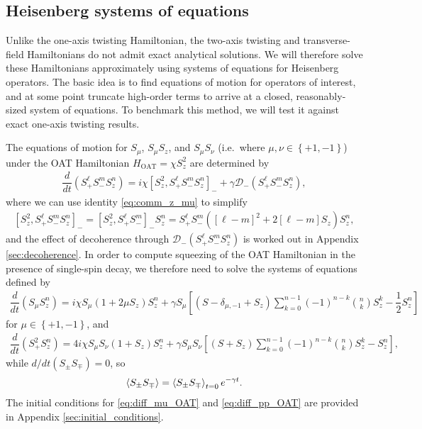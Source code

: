 \documentclass[aps,notitlepage,nofootinbib,11pt]{revtex4-1}
\renewcommand{\t}{\text} %
\newcommand{\f}[2]{\dfrac{#1}{#2}} %
\newcommand{\p}[1]{\left(#1\right)} %
\renewcommand{\sp}[1]{\left[#1\right]} %
\renewcommand{\set}[1]{\left\{#1\right\}} %
\newcommand{\bk}{\Braket} %
\newcommand{\D}{\mathcal{D}}
\newcommand{\1}{\mathds{1}}
\begin{document}
\subsection{Heisenberg systems of equations}

Unlike the one-axis twisting Hamiltonian, the two-axis twisting and
transverse-field Hamiltonians do not admit exact analytical
solutions. We will therefore solve these Hamiltonians approximately
using systems of equations for Heisenberg operators.  The basic idea
is to find equations of motion for operators of interest, and at some
point truncate high-order terms to arrive at a closed,
reasonably-sized system of equations.  To benchmark this method, we
will test it against exact one-axis twisting results.

The equations of motion for $S_\mu$, $S_\mu S_z$, and $S_\mu S_\nu$
(i.e.~where $\mu,\nu\in\set{+1,-1}$) under the OAT Hamiltonian
$H_{\t{OAT}}=\chi S_z^2$ are determined by
\begin{align}
  \f{d}{dt} \p{S_+^\ell S_-^m S_z^n}
  = i\chi \sp{S_z^2, S_+^\ell S_-^m S_z^n}_-
  + \gamma \D_-\p{S_+^\ell S_-^m S_z^n},
\end{align}
where we can use identity \eqref{eq:comm_z_mu} to simplify
\begin{align}
  \sp{S_z^2, S_+^\ell S_-^m S_z^n}_-
  = \sp{S_z^2, S_+^\ell S_-^m}_- S_z^n
  = S_+^\ell S_-^m \p{\sp{\ell-m}^2 + 2\sp{\ell-m} S_z} S_z^n,
  \label{eq:S_z^2_comm}
\end{align}
and the effect of decoherence through $\D_-\p{S_+^\ell S_-^m S_z^n}$ is
worked out in Appendix \ref{sec:decoherence}.  In order to compute
squeezing of the OAT Hamiltonian in the presence of single-spin decay,
we therefore need to solve the systems of equations defined by
\begin{align}
  \f{d}{dt} \p{S_\mu S_z^n}
  = i\chi S_\mu \p{1 + 2\mu S_z} S_z^n
  + \gamma S_\mu \sp{\p{S - \delta_{\mu,-1} + S_z} \sum_{k=0}^{n-1}
    \p{-1}^{n-k} { n \choose k } S_z^k - \f12 S_z^n}
  \label{eq:diff_mu_OAT}
\end{align}
for $\mu\in\set{+1,-1}$, and
\begin{align}
  \f{d}{dt} \p{S_+^2 S_z^n}
  = 4i\chi S_\mu S_\nu \p{1 + S_z} S_z^n
  + \gamma S_\mu S_\nu \sp{\p{S + S_z} \sum_{k=0}^{n-1}
    \p{-1}^{n-k} { n \choose k } S_z^k - S_z^n},
  \label{eq:diff_pp_OAT}
\end{align}
while $d/dt\p{S_\pm S_\mp}=0$, so
\begin{align}
  \bk{S_\pm S_\mp} = \bk{S_\pm S_\mp}_{t=0} e^{-\gamma t}.
\end{align}
The initial conditions for \eqref{eq:diff_mu_OAT} and
\eqref{eq:diff_pp_OAT} are provided in Appendix
\ref{sec:initial_conditions}.
\end{document}
